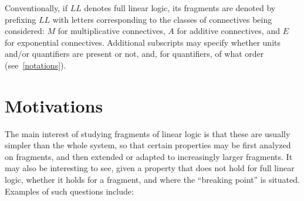 Conventionally, if \(LL\) denotes full linear logic, its fragments are
denoted by prefixing \(LL\) with letters corresponding to the classes of
connectives being considered: \(M\) for multiplicative connectives,
\(A\) for additive connectives, and \(E\) for exponential connectives.
Additional subscripts may specify whether units and/or quantifiers are
present or not, and, for quantifiers, of what order (see~\cref{notations}).

\section{Motivations}\label{motivations}

The main interest of studying fragments of linear logic is that these
are usually simpler than the whole system, so that certain properties
may be first analyzed on fragments, and then extended or adapted to
increasingly larger fragments. It may also be interesting to see, given
a property that does not hold for full linear logic, whether it holds
for a fragment, and where the ``breaking point'' is situated. Examples of
such questions include:
